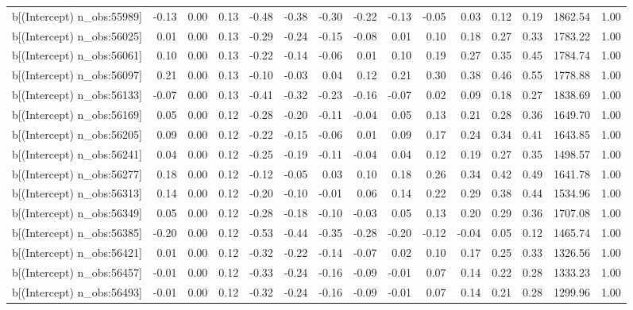 \begin{table}[ht]
\begin{tabular}{rrrrrrrrrrrrrrr}
  b[(Intercept) n\_obs:55989] & -0.13 & 0.00 & 0.13 & -0.48 & -0.38 & -0.30 & -0.22 & -0.13 & -0.05 & 0.03 & 0.12 & 0.19 & 1862.54 & 1.00 \\ 
  b[(Intercept) n\_obs:56025] & 0.01 & 0.00 & 0.13 & -0.29 & -0.24 & -0.15 & -0.08 & 0.01 & 0.10 & 0.18 & 0.27 & 0.33 & 1783.22 & 1.00 \\ 
  b[(Intercept) n\_obs:56061] & 0.10 & 0.00 & 0.13 & -0.22 & -0.14 & -0.06 & 0.01 & 0.10 & 0.19 & 0.27 & 0.35 & 0.45 & 1784.74 & 1.00 \\ 
  b[(Intercept) n\_obs:56097] & 0.21 & 0.00 & 0.13 & -0.10 & -0.03 & 0.04 & 0.12 & 0.21 & 0.30 & 0.38 & 0.46 & 0.55 & 1778.88 & 1.00 \\ 
  b[(Intercept) n\_obs:56133] & -0.07 & 0.00 & 0.13 & -0.41 & -0.32 & -0.23 & -0.16 & -0.07 & 0.02 & 0.09 & 0.18 & 0.27 & 1838.69 & 1.00 \\ 
  b[(Intercept) n\_obs:56169] & 0.05 & 0.00 & 0.12 & -0.28 & -0.20 & -0.11 & -0.04 & 0.05 & 0.13 & 0.21 & 0.28 & 0.36 & 1649.70 & 1.00 \\ 
  b[(Intercept) n\_obs:56205] & 0.09 & 0.00 & 0.12 & -0.22 & -0.15 & -0.06 & 0.01 & 0.09 & 0.17 & 0.24 & 0.34 & 0.41 & 1643.85 & 1.00 \\ 
  b[(Intercept) n\_obs:56241] & 0.04 & 0.00 & 0.12 & -0.25 & -0.19 & -0.11 & -0.04 & 0.04 & 0.12 & 0.19 & 0.27 & 0.35 & 1498.57 & 1.00 \\ 
  b[(Intercept) n\_obs:56277] & 0.18 & 0.00 & 0.12 & -0.12 & -0.05 & 0.03 & 0.10 & 0.18 & 0.26 & 0.34 & 0.42 & 0.49 & 1641.78 & 1.00 \\ 
  b[(Intercept) n\_obs:56313] & 0.14 & 0.00 & 0.12 & -0.20 & -0.10 & -0.01 & 0.06 & 0.14 & 0.22 & 0.29 & 0.38 & 0.44 & 1534.96 & 1.00 \\ 
  b[(Intercept) n\_obs:56349] & 0.05 & 0.00 & 0.12 & -0.28 & -0.18 & -0.10 & -0.03 & 0.05 & 0.13 & 0.20 & 0.29 & 0.36 & 1707.08 & 1.00 \\ 
  b[(Intercept) n\_obs:56385] & -0.20 & 0.00 & 0.12 & -0.53 & -0.44 & -0.35 & -0.28 & -0.20 & -0.12 & -0.04 & 0.05 & 0.12 & 1465.74 & 1.00 \\ 
  b[(Intercept) n\_obs:56421] & 0.01 & 0.00 & 0.12 & -0.32 & -0.22 & -0.14 & -0.07 & 0.02 & 0.10 & 0.17 & 0.25 & 0.33 & 1326.56 & 1.00 \\ 
  b[(Intercept) n\_obs:56457] & -0.01 & 0.00 & 0.12 & -0.33 & -0.24 & -0.16 & -0.09 & -0.01 & 0.07 & 0.14 & 0.22 & 0.28 & 1333.23 & 1.00 \\ 
  b[(Intercept) n\_obs:56493] & -0.01 & 0.00 & 0.12 & -0.32 & -0.24 & -0.16 & -0.09 & -0.01 & 0.07 & 0.14 & 0.21 & 0.28 & 1299.96 & 1.00 \\ 

\end{tabular}
\end{table}
